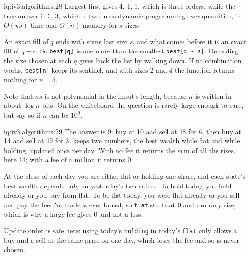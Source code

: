 \begin{solution}{iq:iv3:algorithms:28}
Largest-first gives 4, 1, 1, which is three orders, while the true answer is 3, 3, which is two.  uses dynamic programming over quantities, in $O(ns)$ time and $O(n)$ memory for $s$ sizes.
\label{lst:iv3:al:clips}

An exact fill of $q$ ends with some last size $s$, and what comes before it is an exact fill of $q - s$. So \texttt{best[q]} is one more than the smallest \texttt{best[q - s]}. Recording the size chosen at each $q$ gives back the list by walking down. If no combination works, \texttt{best[n]} keeps its sentinel, and with sizes 2 and 4 the function returns nothing for $n = 5$.

Note that $ns$ is not polynomial in the input's length, because $n$ is written in about $\log n$ bits. On the whiteboard the question is rarely large enough to care, but say so if $n$ can be $10^9$.

\end{solution}

\begin{solution}{iq:iv3:algorithms:29}
The answer is 9: buy at 10 and sell at 18 for 6, then buy at 14 and sell at 19 for 3.  keeps two numbers, the best wealth while flat and while holding, updated once per day. With no fee it returns the sum of all the rises, here 14; with a fee of a million it returns 0.
\enlargethispage{-3\baselineskip}%
\label{lst:iv3:al:tradefee}

At the close of each day you are either flat or holding one share, and each state's best wealth depends only on yesterday's two values. To hold today, you held already or you buy from flat. To be flat today, you were flat already or you sell and pay the fee. No trade is ever forced, so \texttt{flat} starts at 0 and can only rise, which is why a large fee gives 0 and not a loss.

Update order is safe here: using today's \texttt{holding} in today's \texttt{flat} only allows a buy and a sell at the same price on one day, which loses the fee and so is never chosen.

\end{solution}

